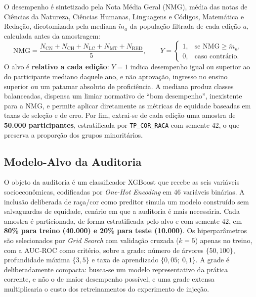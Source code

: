 O desempenho é sintetizado pela Nota Média Geral (NMG), média das notas de Ciências da Natureza, Ciências Humanas, Linguagens e Códigos, Matemática e Redação, dicotomizada pela mediana $\tilde{m}_a$ da população filtrada de cada edição $a$, calculada antes da amostragem:
\begin{equation}
\mathrm{NMG} = \frac{N_{\mathrm{CN}} + N_{\mathrm{CH}} + N_{\mathrm{LC}} + N_{\mathrm{MT}} + N_{\mathrm{RED}}}{5}, \qquad
Y = \begin{cases} 1, & \text{se } \mathrm{NMG} \geq \tilde{m}_a,\\ 0, & \text{caso contrário.} \end{cases}
\label{eq:alvo}
\end{equation}
O alvo é \textbf{relativo a cada edição}: $Y = 1$ indica desempenho igual ou superior ao do participante mediano daquele ano, e não aprovação, ingresso no ensino superior ou um patamar absoluto de proficiência. A mediana produz classes balanceadas, dispensa um limiar normativo de ``bom desempenho'', inexistente para a NMG, e permite aplicar diretamente as métricas de equidade baseadas em taxas de seleção e de erro. Por fim, extrai-se de cada edição uma amostra de \textbf{50.000 participantes}, estratificada por \texttt{TP\_COR\_RACA} com semente 42, o que preserva a proporção dos grupos minoritários.

\subsection{Modelo-Alvo da Auditoria}
\label{sec:modelo}

O objeto da auditoria é um classificador XGBoost \cite{chen2016xgboost} que recebe as seis variáveis socioeconômicas, codificadas por \textit{One-Hot Encoding} em 46 variáveis binárias. A inclusão deliberada de raça/cor como preditor simula um modelo construído sem salvaguardas de equidade, cenário em que a auditoria é mais necessária. Cada amostra é particionada, de forma estratificada pelo alvo e com semente 42, em \textbf{80\% para treino (40.000) e 20\% para teste (10.000)}. Os hiperparâmetros são selecionados por \textit{Grid Search} com validação cruzada ($k=5$) apenas no treino, com a AUC-ROC como critério, sobre a grade: número de árvores $\{50, 100\}$, profundidade máxima $\{3, 5\}$ e taxa de aprendizado $\{0{,}05;\ 0{,}1\}$. A grade é deliberadamente compacta: busca-se um modelo representativo da prática corrente, e não o de maior desempenho possível, e uma grade extensa multiplicaria o custo dos retreinamentos do experimento de injeção.

